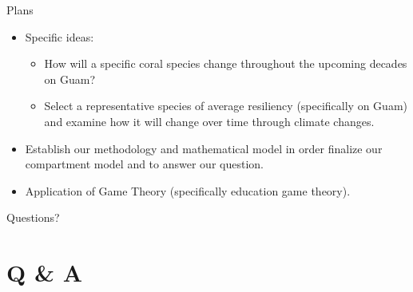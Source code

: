 \documentclass{beamer}
\begin{document}
\begin{frame}{Plans}
    \begin{itemize}
        \item Specific ideas:
        \begin{itemize}
            \item How will a specific coral species change throughout the upcoming decades on Guam?
            \item Select a representative species of average resiliency (specifically on Guam) and examine how it will change over time through climate changes.
        \end{itemize}
        \item Establish our methodology and mathematical model in order finalize our compartment model and to answer our question.
        \item Application of Game Theory (specifically education game theory).
    \end{itemize}
\end{frame}





\begin{frame}
    \Huge{Questions?}
\end{frame}

\section{Q \& A}


\end{document}
